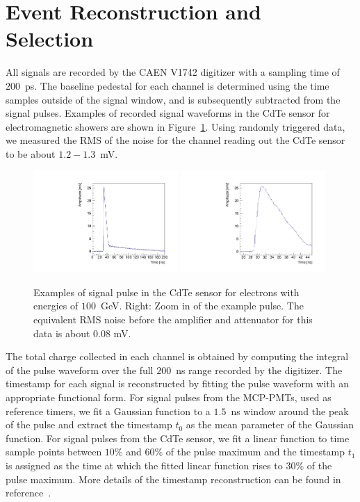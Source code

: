 
\section{Event Reconstruction and Selection }
\label{sec:reco}

All signals are recorded by the CAEN V1742 digitizer with a sampling time of $200$~ps.
The baseline pedestal for each channel is determined using the time samples outside of
the signal window, and is subsequently subtracted from the signal pulses. Examples of recorded
signal waveforms in the CdTe sensor for electromagnetic showers are shown in Figure~\ref{fig:Pulses}.
Using randomly triggered data, we measured the RMS of the noise for the channel reading out 
the CdTe sensor to be about $1.2-1.3$~mV. 

\begin{figure}[htbp] 
\centering
\includegraphics[width=0.49\textwidth]{figures/CdTe_pulse.pdf}
\includegraphics[width=0.49\textwidth]{figures/CdTe_pulseZ.pdf} 
\caption{Examples of signal pulse in the CdTe sensor for electrons with energies of $100$~GeV. Right: Zoom in of the example pulse. The equivalent RMS noise before the amplifier and attenuator for this data is about 0.08 mV.} 
\label{fig:Pulses} 
\end{figure} 

The total charge collected in each channel is obtained by computing the integral of the pulse
waveform over the full $200$~ns range recorded by the digitizer. 
The timestamp for each signal is reconstructed by fitting the pulse waveform with
an appropriate functional form. For signal pulses from the MCP-PMTs, used as reference timers, 
we fit a Gaussian function to a $1.5$~ns window around the peak of the pulse and extract the 
timestamp $t_{0}$ as the mean parameter of the Gaussian function. For signal pulses from the
CdTe sensor, we fit a linear function to time sample points between $10\%$ and $60\%$ of the pulse
maximum and the timestamp $t_{1}$ is assigned as the time at which the fitted linear function
rises to $30\%$ of the pulse maximum. More details of the timestamp reconstruction can be
found in reference~\cite{Anderson:2015gha}.


